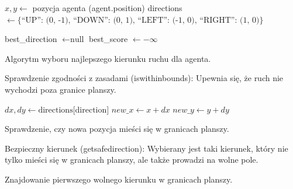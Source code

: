 \documentclass[12pt,a4paper]{article}
\begin{document}
\begin{algorithm}[H]

$x, y \gets$ pozycja agenta (agent.position)\;
directions $\gets \{\text{``UP'': (0, -1), ``DOWN'': (0, 1), ``LEFT'': (-1, 0), ``RIGHT'': (1, 0)}\}$\;

best\_direction $\gets \text{null}$\;
best\_score $\gets -\infty$\;


\;

\caption{Algorytm wyboru najlepszego kierunku ruchu dla agenta.}
\end{algorithm}

Sprawdzenie zgodności z zasadami (is\textunderscore within\textunderscore bounds):
Upewnia się, że ruch nie wychodzi poza granice planszy.

\begin{algorithm}[H]

$dx, dy \gets \text{directions[direction]}$\;
$new\_x \gets x + dx$\;
$new\_y \gets y + dy$\;

\;

\caption{Sprawdzenie, czy nowa pozycja mieści się w granicach planszy.}
\end{algorithm}


Bezpieczny kierunek (get\textunderscore safe\textunderscore direction):
Wybierany jest taki kierunek, który nie tylko mieści się w granicach planszy, ale także prowadzi na wolne pole.

\begin{algorithm}[H]

\caption{Znajdowanie pierwszego wolnego kierunku w granicach planszy.}
\end{algorithm}
\end{document}
